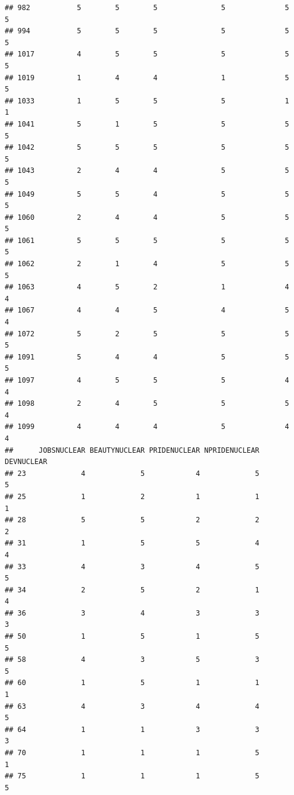 \documentclass[
]{article}
\begin{document}
\begin{verbatim}
## 982           5        5        5               5              5             5
## 994           5        5        5               5              5             5
## 1017          4        5        5               5              5             5
## 1019          1        4        4               1              5             5
## 1033          1        5        5               5              1             1
## 1041          5        1        5               5              5             5
## 1042          5        5        5               5              5             5
## 1043          2        4        4               5              5             5
## 1049          5        5        4               5              5             5
## 1060          2        4        4               5              5             5
## 1061          5        5        5               5              5             5
## 1062          2        1        4               5              5             5
## 1063          4        5        2               1              4             4
## 1067          4        4        5               4              5             4
## 1072          5        2        5               5              5             5
## 1091          5        4        4               5              5             5
## 1097          4        5        5               5              4             4
## 1098          2        4        5               5              5             4
## 1099          4        4        4               5              4             4
##      JOBSNUCLEAR BEAUTYNUCLEAR PRIDENUCLEAR NPRIDENUCLEAR DEVNUCLEAR
## 23             4             5            4             5          5
## 25             1             2            1             1          1
## 28             5             5            2             2          2
## 31             1             5            5             4          4
## 33             4             3            4             5          5
## 34             2             5            2             1          4
## 36             3             4            3             3          3
## 50             1             5            1             5          5
## 58             4             3            5             3          5
## 60             1             5            1             1          1
## 63             4             3            4             4          5
## 64             1             1            3             3          3
## 70             1             1            1             5          1
## 75             1             1            1             5          5

\end{verbatim}
\end{document}
